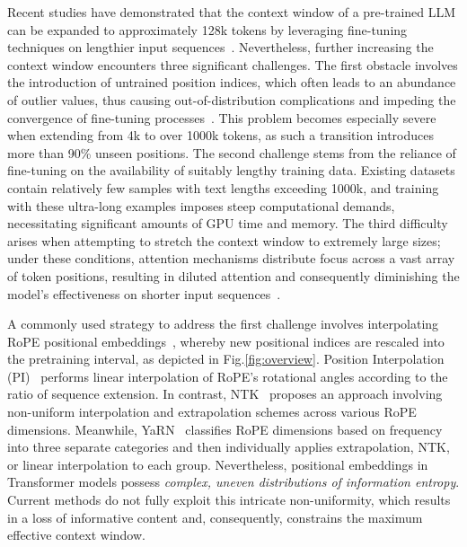 Recent studies have demonstrated that the context window of a pre-trained LLM can be expanded to approximately 128k tokens by leveraging fine-tuning techniques on lengthier input sequences~\cite{longlora,pi,yarn,zhang2024soaring,liu2023scaling}. Nevertheless, further increasing the context window encounters three significant challenges. The first obstacle involves the introduction of untrained position indices, which often leads to an abundance of outlier values, thus causing out-of-distribution complications and impeding the convergence of fine-tuning processes~\cite{pi}. This problem becomes especially severe when extending from 4k to over 1000k tokens, as such a transition introduces more than 90\% unseen positions. The second challenge stems from the reliance of fine-tuning on the availability of suitably lengthy training data. Existing datasets contain relatively few samples with text lengths exceeding 1000k, and training with these ultra-long examples imposes steep computational demands, necessitating significant amounts of GPU time and memory. The third difficulty arises when attempting to stretch the context window to extremely large sizes; under these conditions, attention mechanisms distribute focus across a vast array of token positions, resulting in diluted attention and consequently diminishing the model’s effectiveness on shorter input sequences~\cite{pi}.

A commonly used strategy to address the first challenge involves interpolating RoPE positional embeddings~\cite{rope,pi}, whereby new positional indices are rescaled into the pretraining interval, as depicted in Fig.\ref{fig:overview}. Position Interpolation (PI)~\cite{pi} performs linear interpolation of RoPE's rotational angles according to the ratio of sequence extension. In contrast, NTK~\cite{ntk,dynamicntk} proposes an approach involving non-uniform interpolation and extrapolation schemes across various RoPE dimensions. Meanwhile, YaRN~\cite{yarn} classifies RoPE dimensions based on frequency into three separate categories and then individually applies extrapolation, NTK, or linear interpolation to each group. Nevertheless, positional embeddings in Transformer models possess \emph{complex, uneven distributions of information entropy}. Current methods do not fully exploit this intricate non-uniformity, which results in a loss of informative content and, consequently, constrains the maximum effective context window.

